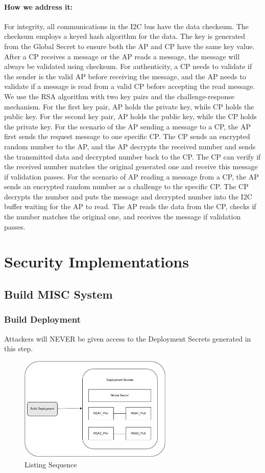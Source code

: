 \documentclass[11pt,oneside,onecolumn,letterpaper]{article}
\newcounter{alg}
\begin{document}
	\paragraph{How we address it:}
	For integrity,
	all communications in the I2C bus have the data checksum.
	The checksum employs a keyed hash algorithm for the data.
	The key is generated from the Global Secret to ensure both the AP and CP have the same key value.
	After a CP receives a message or the AP reads a message,
	the message will always be validated using checksum.
	For authenticity,
	a CP needs to validate if the sender is the valid AP before receiving the message,
	and the AP needs to validate if a message is read from a valid CP before accepting the read message.
	We use the RSA algorithm with two key pairs and the challenge-response mechanism.
	For the first key pair,
	AP holds the private key,
	while CP holds the public key.
	For the second key pair,
	AP holds the public key,
	while the CP holds the private key.
	For the scenario of the AP sending a message to a CP,
	the AP first sends the request message to one specific CP.
	The CP sends an encrypted random number to the AP,
	and the AP decrypts the received number and sends the transmitted data and decrypted number back to the CP.
	The CP can verify if the received number matches the original generated one and receive this message if validation passes.
	For the scenario of AP reading a message from a CP,
	the AP sends an encrypted random number as a challenge to the specific CP.
	The CP decrypts the number and puts the message and decrypted number into the I2C buffer waiting for the AP to read.
	The AP reads the data from the CP,
	checks if the number matches the original one,
	and receives the message if validation passes.
	
	
	\section{Security Implementations}
	
	
	\subsection{Build MISC System}
	\subsubsection{Build Deployment}
	Attackers will NEVER be given access to the Deployment Secrets generated in this step.
	\begin{figure}[h]
		\centering
		\includegraphics[width=0.65\textwidth]{pics/secret.pdf}
		\caption{Listing Sequence}
		\label{fig:secret}
	\end{figure}
	
\end{document}
